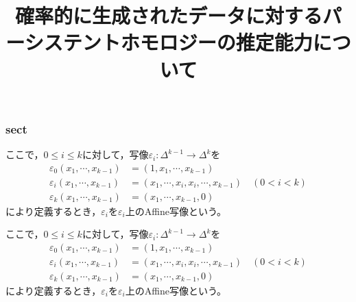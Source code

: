 \documentclass[10.5pt, a4, dvipdfmx, landscape]{article}
\title{確率的に生成されたデータに対するパーシステントホモロジーの推定能力について}
\begin{document}
\maketitle


\begin{frame}
  \frametitle{sect}
  ここで，$0 \leq i \leq k$に対して，写像$\varepsilon_i: \Delta^{k - 1} \to \Delta^k$を
  \begin{align*}
    \varepsilon_0 \left( x_1, \cdots, x_{k - 1} \right) & = \left( 1, x_1, \cdots, x_{k - 1} \right)                                               \\
    \varepsilon_i \left( x_1, \cdots, x_{k - 1} \right) & = \left( x_1, \cdots, x_i, x_i, \cdots, x_{k - 1} \right) \quad \left( 0 < i < k \right) \\
    \varepsilon_k \left( x_1, \cdots, x_{k - 1} \right) & = \left( x_1, \cdots, x_{k - 1}, 0 \right)
  \end{align*}
  により定義するとき，$\varepsilon_i$を$\varepsilon_i$上のAffine写像という。

  \begin{dfn}
    ここで，$0 \leq i \leq k$に対して，写像$\varepsilon_i: \Delta^{k - 1} \to \Delta^k$を
    \begin{align*}
      \varepsilon_0 \left( x_1, \cdots, x_{k - 1} \right) & = \left( 1, x_1, \cdots, x_{k - 1} \right)                                               \\
      \varepsilon_i \left( x_1, \cdots, x_{k - 1} \right) & = \left( x_1, \cdots, x_i, x_i, \cdots, x_{k - 1} \right) \quad \left( 0 < i < k \right) \\
      \varepsilon_k \left( x_1, \cdots, x_{k - 1} \right) & = \left( x_1, \cdots, x_{k - 1}, 0 \right)
    \end{align*}
    により定義するとき，$\varepsilon_i$を$\varepsilon_i$上のAffine写像という。
  \end{dfn}
\end{frame}
\end{document}
